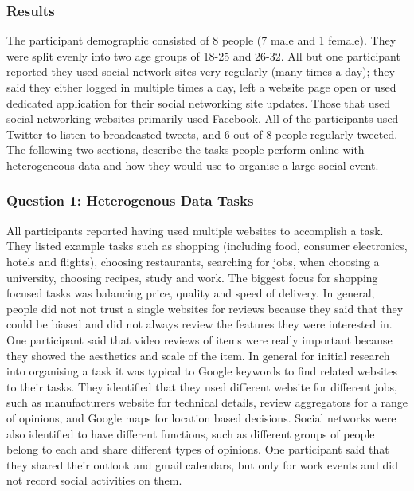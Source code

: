 \documentclass{sigchi}
\begin{document}
\subsubsection{Results}
The participant demographic consisted of 8 people (7 male and 1 female).  They were split evenly into two age groups of 18-25 and 26-32.  All but one participant reported they used social network sites very regularly (many times a day); they said they either logged in multiple times a day, left a website page open or used dedicated application for their social networking site updates.  Those that used social networking websites primarily used Facebook.  All of the participants used Twitter to listen to broadcasted tweets, and 6 out of 8 people regularly tweeted.  The following two sections, describe the tasks people perform online with heterogeneous data and how they would use to organise a large social event.

\subsubsection{Question 1: Heterogenous Data Tasks}
All participants reported having used multiple websites to accomplish a task.  They listed example tasks such as shopping (including food, consumer electronics, hotels and flights), choosing restaurants, searching for jobs, when choosing a university, choosing recipes, study and work.  The biggest focus for shopping focused tasks was balancing price, quality and speed of delivery.  In general, people did not not trust a single websites for reviews because they said that they could be biased and did not always review the features they were interested in.  One participant said that video reviews of items were really important because they showed the aesthetics and scale of the item.  In general for initial research into organising a task it was typical to Google keywords to find related websites to their tasks.  They identified that they used different website for different jobs, such as manufacturers website for technical details, review aggregators for a range of opinions, and Google maps for location based decisions.  Social networks were also identified to have different functions, such as different groups of people belong to each and share different types of opinions.  One participant said that they shared their outlook and gmail calendars, but only for work events and did not record social activities on them.
\end{document}
